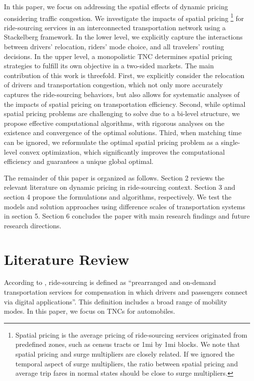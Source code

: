 \documentclass[review]{elsarticle}
\begin{document}
In this paper, we focus on addressing the spatial effects of dynamic pricing considering traffic congestion. We investigate the impacts of spatial pricing \footnote{Spatial pricing is the average pricing of ride-sourcing services originated from predefined zones, such as census tracts or 1mi by 1mi blocks. We note that spatial pricing and surge multipliers are closely related. If we ignored the temporal aspect of surge multipliers, the ratio between spatial pricing and average trip fares in normal states should be close to surge multipliers.} for ride-sourcing services in an interconnected transportation network using a Stackelberg framework. In the lower level, we explicitly capture the interactions between drivers' relocation, riders' mode choice, and all travelers' routing decisions. In the upper level, a monopolistic TNC determines spatial pricing strategies to fulfill its own objective in a two-sided markets. The main contribution of this work is threefold. First, we explicitly consider the relocation of drivers and transportation congestion, which not only more accurately captures the ride-sourcing behaviors, but also allows for systematic analyses of the impacts of spatial pricing on transportation efficiency. Second, while optimal spatial pricing problems are challenging to solve due to a bi-level structure, we propose effective computational algorithms, with rigorous analyses on the existence and convergence of the optimal solutions. Third, when matching time can be ignored, we reformulate the optimal spatial pricing problem as a single-level convex optimization, which significantly improves the computational efficiency and guarantees a unique global optimal.

The remainder of this paper is organized as follows. Section 2 reviews the relevant literature on dynamic pricing in ride-sourcing context. Section 3 and section 4 propose the formulations and algorithms, respectively. We test the models and solution approaches using difference scales of transportation systems in section 5. Section 6 concludes the paper with main research findings and future research directions.

\section{Literature Review}

According to \cite{sae2018taxonomy}, ride-sourcing is defined as ``prearranged and on-demand transportation services for compensation in which drivers and passengers connect via digital applications''. This definition includes a broad range of mobility modes. In this paper, we focus on TNCs for automobiles.
\end{document}
